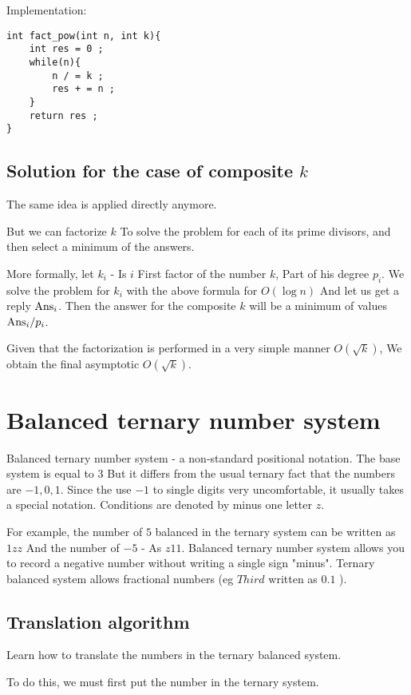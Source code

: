 Implementation:

\begin{verbatim}
int fact_pow(int n, int k){
    int res = 0 ;
    while(n){
        n / = k ;
        res + = n ;
    }
    return res ;
} 
\end{verbatim}
\subsection{ Solution for the case of composite $k$}

The same idea is applied directly anymore.

But we can factorize $k$ To solve the problem for each of its prime divisors, and then select a minimum of the answers.

More formally, let $k_i$ - Is $i$ First factor of the number $k$, Part of his degree $p_i$. We solve the problem for $k_i$ with the above formula for $O (\log n)$ And let us get a reply ${\rm Ans} _i$. Then the answer for the composite $k$ will be a minimum of values ${\rm Ans} _i / p_i$.

Given that the factorization is performed in a very simple manner $O (\sqrt {k})$, We obtain the final asymptotic $O (\sqrt {k})$.

\section{ Balanced ternary number system }
Balanced ternary number system - a non-standard positional notation. The base system is equal to $3$ But it differs from the usual ternary fact that the numbers are $-1, 0, 1$. Since the use $-1$ to single digits very uncomfortable, it usually takes a special notation. Conditions are denoted by minus one letter $z$.

For example, the number of $5$ balanced in the ternary system can be written as $1zz$ And the number of $-5$ - As $z11$. Balanced ternary number system allows you to record a negative number without writing a single sign "minus". Ternary balanced system allows fractional numbers (eg $Third$ written as $0.1$ ).

\subsection{ Translation algorithm }

Learn how to translate the numbers in the ternary balanced system.

To do this, we must first put the number in the ternary system.

